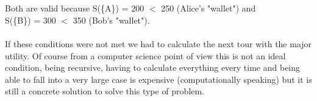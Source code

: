 \documentclass{article}
\begin{document}
\\\\Both are valid because S(\{A\}) = 200 $<$ 250 (Alice's "wallet") and \\S(\{B\}) = 300 $<$ 350 (Bob's "wallet"). \\\\If these conditions were not met we had to calculate the next tour with the major utility. Of course from a computer science point of view this is not an ideal condition, being recursive, having to calculate everything every time and being able to fall into a very large case is expensive (computationally speaking) but it is still a concrete solution to solve this type of problem.
\end{document}
